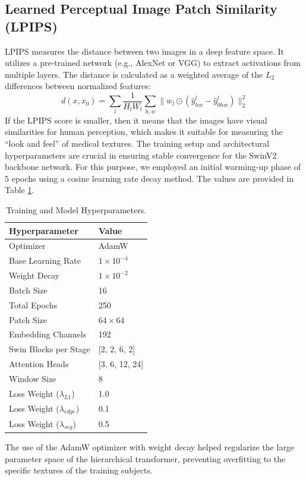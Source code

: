 \subsection{Learned Perceptual Image Patch Similarity (LPIPS)}
LPIPS measures the distance between two images in a deep feature space. It utilizes a pre-trained network (e.g., AlexNet or VGG) to extract activations from multiple layers. The distance is calculated as a weighted average of the $L_2$ differences between normalized features:
\begin{equation}
    d(x, x_0) = \sum_l \frac{1}{H_l W_l} \sum_{h,w} \| w_l \odot (\hat{y}_{hw}^l - \hat{y}_{0hw}^l) \|_2^2
\end{equation}
If the LPIPS score is smaller, then it means that the images have visual similarities for human perception, which makes it suitable for measuring the “look and feel” of medical textures.
The training setup and architectural hyperparameters are crucial in ensuring stable convergence for the SwinV2 backbone network. For this purpose, we employed an initial warming-up phase of 5 epochs using a cosine learning rate decay method. The values are provided in Table \ref{tab:hyperparameters}.

\begin{table}[H]
    \centering
    \caption{Training and Model Hyperparameters.}
    \label{tab:hyperparameters}
    \begin{tabular}{ll}
        \toprule
        \textbf{Hyperparameter} & \textbf{Value} \\
        \midrule
        Optimizer & AdamW \\
        Base Learning Rate & $1 \times 10^{-4}$ \\
        Weight Decay & $1 \times 10^{-2}$ \\
        Batch Size & 16 \\
        Total Epochs & 250 \\
        Patch Size & $64 \times 64$ \\
        Embedding Channels & 192 \\
        Swin Blocks per Stage & [2, 2, 6, 2] \\
        Attention Heads & [3, 6, 12, 24] \\
        Window Size & 8 \\
        Loss Weight ($\lambda_{L1}$) & 1.0 \\
        Loss Weight ($\lambda_{edge}$) & 0.1 \\
        Loss Weight ($\lambda_{seg}$) & 0.5 \\
        \bottomrule
    \end{tabular}
\end{table}
The use of the AdamW optimizer with weight decay helped regularize the large parameter space of the hierarchical transformer, preventing overfitting to the specific textures of the training subjects.

